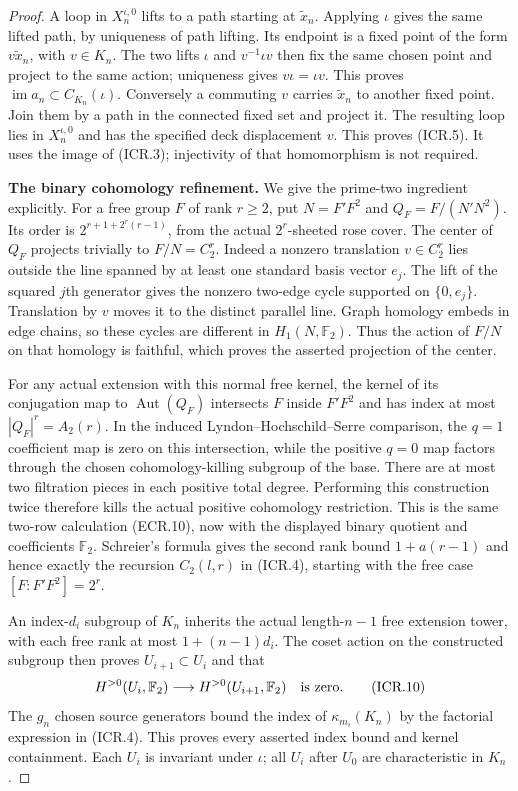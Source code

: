 \begin{proof}
A loop in $X_n^{\iota,0}$ lifts to a path starting at
$\widetilde x_n$.  Applying $\iota$ gives the same lifted path,
by uniqueness of path lifting.  Its endpoint is a fixed point of
the form $v\widetilde x_n$, with $v\in K_n$.  The two lifts
$\iota$ and $v^{-1}\iota v$ then fix the same chosen point and
project to the same action; uniqueness gives $v\iota=\iota v$.
This proves $\operatorname{im}a_n\subset C_{K_n}(\iota)$.
Conversely a commuting $v$ carries $\widetilde x_n$ to another
fixed point.  Join them by a path in the connected fixed set and
project it.  The resulting loop lies in $X_n^{\iota,0}$ and has
the specified deck displacement $v$.  This proves (ICR.5).
It uses the image of (ICR.3); injectivity of that homomorphism is
not required.

\par\medskip\noindent\textbf{The binary cohomology refinement.}\quad
We give the prime-two ingredient explicitly.  For a free group $F$
of rank $r\geq2$, put $N=F'F^2$ and
$Q_F=F/(N'N^2)$.  Its order is
$2^{r+1+2^r(r-1)}$, from the actual $2^r$-sheeted rose cover.
The center of $Q_F$ projects trivially to $F/N=C_2^r$.
Indeed a nonzero translation $v\in C_2^r$ lies outside the line
spanned by at least one standard basis vector $e_j$.
The lift of the squared $j$th generator gives the nonzero
two-edge cycle supported on $\{0,e_j\}$.  Translation by $v$
moves it to the distinct parallel line.  Graph homology embeds in
edge chains, so these cycles are different in $H_1(N,\mathbb F_2)$.
Thus the action of $F/N$ on that homology is faithful, which proves
the asserted projection of the center.

For any actual extension with this normal free kernel, the kernel
of its conjugation map to $\operatorname{Aut}(Q_F)$ intersects $F$
inside $F'F^2$ and has index at most $|Q_F|^r=A_2(r)$.
In the induced Lyndon--Hochschild--Serre comparison, the $q=1$
coefficient map is zero on this intersection, while the positive
$q=0$ map factors through the chosen cohomology-killing subgroup of
the base.  There are at most two filtration pieces in each positive
total degree.  Performing this construction twice therefore kills
the actual positive cohomology restriction.  This is the same
two-row calculation (ECR.10), now with the displayed binary quotient
and coefficients $\mathbb F_2$.  Schreier's formula gives the second
rank bound $1+a(r-1)$ and hence exactly the recursion $C_2(l,r)$ in
(ICR.4), starting with the free case $[F:F'F^2]=2^r$.

An index-$d_i$ subgroup of $K_n$ inherits the actual length-$n-1$
free extension tower, with each free rank at most
$1+(n-1)d_i$.  The coset action on the constructed subgroup then
proves $U_{i+1}\subset U_i$ and that
\[
             H^{>0}(U_i,\mathbb F_2)\longrightarrow
             H^{>0}(U_{i+1},\mathbb F_2)\quad\hbox{is zero}.
                                                               \tag{ICR.10}
\]
The $g_n$ chosen source generators bound the index of
$\kappa_{m_i}(K_n)$ by the factorial expression in (ICR.4).
This proves every asserted index bound and kernel containment.
Each $U_i$ is invariant under $\iota$; all $U_i$ after $U_0$ are
characteristic in $K_n$.


\end{proof}
